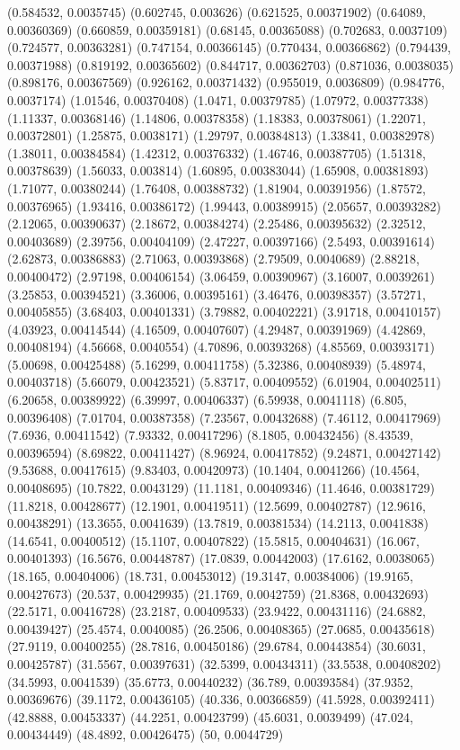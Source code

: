 {(0.584532, 0.0035745)
(0.602745, 0.003626)
(0.621525, 0.00371902)
(0.64089, 0.00360369)
(0.660859, 0.00359181)
(0.68145, 0.00365088)
(0.702683, 0.0037109)
(0.724577, 0.00363281)
(0.747154, 0.00366145)
(0.770434, 0.00366862)
(0.794439, 0.00371988)
(0.819192, 0.00365602)
(0.844717, 0.00362703)
(0.871036, 0.0038035)
(0.898176, 0.00367569)
(0.926162, 0.00371432)
(0.955019, 0.0036809)
(0.984776, 0.0037174)
(1.01546, 0.00370408)
(1.0471, 0.00379785)
(1.07972, 0.00377338)
(1.11337, 0.00368146)
(1.14806, 0.00378358)
(1.18383, 0.00378061)
(1.22071, 0.00372801)
(1.25875, 0.0038171)
(1.29797, 0.00384813)
(1.33841, 0.00382978)
(1.38011, 0.00384584)
(1.42312, 0.00376332)
(1.46746, 0.00387705)
(1.51318, 0.00378639)
(1.56033, 0.003814)
(1.60895, 0.00383044)
(1.65908, 0.00381893)
(1.71077, 0.00380244)
(1.76408, 0.00388732)
(1.81904, 0.00391956)
(1.87572, 0.00376965)
(1.93416, 0.00386172)
(1.99443, 0.00389915)
(2.05657, 0.00393282)
(2.12065, 0.00390637)
(2.18672, 0.00384274)
(2.25486, 0.00395632)
(2.32512, 0.00403689)
(2.39756, 0.00404109)
(2.47227, 0.00397166)
(2.5493, 0.00391614)
(2.62873, 0.00386883)
(2.71063, 0.00393868)
(2.79509, 0.0040689)
(2.88218, 0.00400472)
(2.97198, 0.00406154)
(3.06459, 0.00390967)
(3.16007, 0.0039261)
(3.25853, 0.00394521)
(3.36006, 0.00395161)
(3.46476, 0.00398357)
(3.57271, 0.00405855)
(3.68403, 0.00401331)
(3.79882, 0.00402221)
(3.91718, 0.00410157)
(4.03923, 0.00414544)
(4.16509, 0.00407607)
(4.29487, 0.00391969)
(4.42869, 0.00408194)
(4.56668, 0.0040554)
(4.70896, 0.00393268)
(4.85569, 0.00393171)
(5.00698, 0.00425488)
(5.16299, 0.00411758)
(5.32386, 0.00408939)
(5.48974, 0.00403718)
(5.66079, 0.00423521)
(5.83717, 0.00409552)
(6.01904, 0.00402511)
(6.20658, 0.00389922)
(6.39997, 0.00406337)
(6.59938, 0.0041118)
(6.805, 0.00396408)
(7.01704, 0.00387358)
(7.23567, 0.00432688)
(7.46112, 0.00417969)
(7.6936, 0.00411542)
(7.93332, 0.00417296)
(8.1805, 0.00432456)
(8.43539, 0.00396594)
(8.69822, 0.00411427)
(8.96924, 0.00417852)
(9.24871, 0.00427142)
(9.53688, 0.00417615)
(9.83403, 0.00420973)
(10.1404, 0.0041266)
(10.4564, 0.00408695)
(10.7822, 0.0043129)
(11.1181, 0.00409346)
(11.4646, 0.00381729)
(11.8218, 0.00428677)
(12.1901, 0.00419511)
(12.5699, 0.00402787)
(12.9616, 0.00438291)
(13.3655, 0.0041639)
(13.7819, 0.00381534)
(14.2113, 0.0041838)
(14.6541, 0.00400512)
(15.1107, 0.00407822)
(15.5815, 0.00404631)
(16.067, 0.00401393)
(16.5676, 0.00448787)
(17.0839, 0.00442003)
(17.6162, 0.0038065)
(18.165, 0.00404006)
(18.731, 0.00453012)
(19.3147, 0.00384006)
(19.9165, 0.00427673)
(20.537, 0.00429935)
(21.1769, 0.0042759)
(21.8368, 0.00432693)
(22.5171, 0.00416728)
(23.2187, 0.00409533)
(23.9422, 0.00431116)
(24.6882, 0.00439427)
(25.4574, 0.0040085)
(26.2506, 0.00408365)
(27.0685, 0.00435618)
(27.9119, 0.00400255)
(28.7816, 0.00450186)
(29.6784, 0.00443854)
(30.6031, 0.00425787)
(31.5567, 0.00397631)
(32.5399, 0.00434311)
(33.5538, 0.00408202)
(34.5993, 0.0041539)
(35.6773, 0.00440232)
(36.789, 0.00393584)
(37.9352, 0.00369676)
(39.1172, 0.00436105)
(40.336, 0.00366859)
(41.5928, 0.00392411)
(42.8888, 0.00453337)
(44.2251, 0.00423799)
(45.6031, 0.0039499)
(47.024, 0.00434449)
(48.4892, 0.00426475)
(50, 0.0044729)
}

